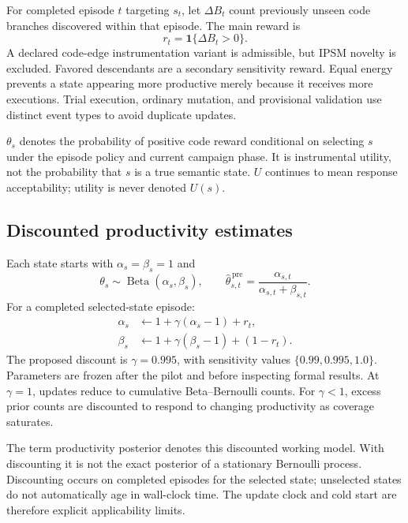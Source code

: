 \documentclass[final,5p,times,number]{elsarticle}
\begin{document}
For completed episode $t$ targeting $s_t$, let $\Delta B_t$ count previously unseen code branches discovered within that episode. The main reward is
\begin{equation}
r_t=\mathbf{1}\{\Delta B_t>0\}.
\label{eq:reward}
\end{equation}
A declared code-edge instrumentation variant is admissible, but IPSM novelty is excluded. Favored descendants are a secondary sensitivity reward. Equal energy prevents a state appearing more productive merely because it receives more executions. Trial execution, ordinary mutation, and provisional validation use distinct event types to avoid duplicate updates.

$\theta_s$ denotes the probability of positive code reward conditional on selecting $s$ under the episode policy and current campaign phase. It is instrumental utility, not the probability that $s$ is a true semantic state. $U$ continues to mean response acceptability; utility is never denoted $U(s)$.

\subsection{Discounted productivity estimates}
Each state starts with $\alpha_s=\beta_s=1$ and
\begin{equation}
\theta_s\sim\operatorname{Beta}(\alpha_s,\beta_s),\qquad
\widehat{\theta}_{s,t}^{\,\mathrm{pre}}
=\frac{\alpha_{s,t}}{\alpha_{s,t}+\beta_{s,t}}.
\end{equation}
For a completed selected-state episode:
\begin{align}
\alpha_s&\leftarrow1+\gamma(\alpha_s-1)+r_t,\\
\beta_s&\leftarrow1+\gamma(\beta_s-1)+(1-r_t).
\label{eq:update}
\end{align}
The proposed discount is $\gamma=0.995$, with sensitivity values $\{0.99,0.995,1.0\}$. Parameters are frozen after the pilot and before inspecting formal results. At $\gamma=1$, updates reduce to cumulative Beta--Bernoulli counts. For $\gamma<1$, excess prior counts are discounted to respond to changing productivity as coverage saturates.

The term productivity posterior denotes this discounted working model. With discounting it is not the exact posterior of a stationary Bernoulli process. Discounting occurs on completed episodes for the selected state; unselected states do not automatically age in wall-clock time. The update clock and cold start are therefore explicit applicability limits.
\end{document}
